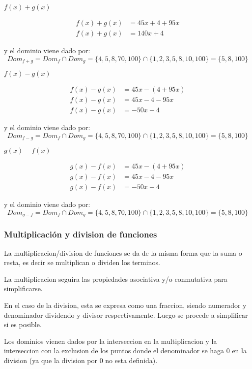     $ f(x)+g(x) $

    \begin{align*}
        f(x)+g(x) &= 45x+4+95x 		\\
        f(x)+ g(x)&= 140x + 4
    \end{align*}

    y el dominio viene dado por:
    $$ Dom_{f+g} = Dom_f \cap Dom_g =\{4,5,8,70,100\} \cap \{1,2,3,5,8,10,100\}=\{5,8,100\} $$


    $ f(x)-g(x) $

    \begin{align*}
        f(x)-g(x) &= 45x-(4+95x) 		\\
        f(x)- g(x)&= 45x - 4 -95x\\
        f(x)- g(x)&= -50x - 4
    \end{align*}

    y el dominio viene dado por:
    $$ Dom_{f-g} = Dom_f \cap Dom_g =\{4,5,8,70,100\} \cap \{1,2,3,5,8,10,100\}=\{5,8,100\} $$


    $ g(x)-f(x) $

    \begin{align*}
        g(x)-f(x) &= 45x-(4+95x) 		\\
        g(x)-f(x)&= 45x - 4 -95x\\
        g(x)-f(x)&= -50x - 4
    \end{align*}

    y el dominio viene dado por:
    $$ Dom_{g-f} = Dom_f \cap Dom_g =\{4,5,8,70,100\} \cap \{1,2,3,5,8,10,100\}=\{5,8,100\} $$

\subsubsection*{Multiplicación y division de funciones} \label{Multiplicacion_de_funciones}

La multiplicacion/division de funciones se da de la misma forma que la suma o
resta, es decir se multiplican o dividen los terminos.

La multiplicacion seguira las propiedades asociativa y/o conmutativa para simplificarse.

En el caso de la division, esta se expresa como una fraccion, siendo numerador
y denominador dividendo y divisor respectivamente. Luego se procede a simplificar
si es posible.

Los dominios vienen dados por la interseccion en la multiplicacion y la interseccion
con la exclusion de los puntos donde el denominador se haga 0 en la division
(ya que la division por 0 no esta definida).


